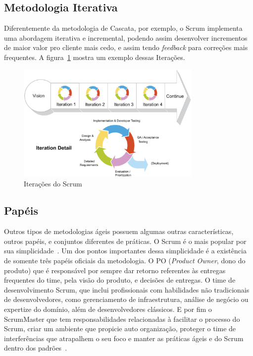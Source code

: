 \subsection{Metodologia Iterativa}

Diferentemente da metodologia de Cascata, por exemplo, o Scrum implementa uma
abordagem iterativa e incremental, podendo assim desenvolver incrementos de
maior valor pro cliente mais cedo, e assim tendo \textit{feedback} para correções
mais frequentes. A figura~\ref{fig:iterative} mostra um exemplo dessas
Iterações.~\cite{scrumreference:2016}

\begin{figure}[H]
  \centering
  \includegraphics[width=0.8\textwidth]{figuras/iterative.eps}
  \caption{Iterações do Scrum}
  \label{fig:iterative}
\end{figure}

\subsection{Papéis}

Outros tipos de metodologias ágeis possuem algumas outras características, outros
papéis, e conjuntos diferentes de práticas. O Scrum é o mais popular por sua
simplicidade~\cite{ilieva2004analyses}. Um dos pontos importantes dessa
simplicidade é a existência de somente três papéis oficiais da metodologia. O 
PO (\textit{Product Owner}, dono do produto) que é responsável por sempre dar
retorno referentes às entregas frequentes do time, pela visão do produto,
e decisões de entregas. O time de desenvolvimento Scrum, que inclui profissionais
com habilidades não tradicionais de desenvolvedores, como gerenciamento de
infraestrutura, análise de negócio ou expertize do domínio, além de
desenvolvedores clássicos. E por fim o ScrumMaster que tem responsabilidades
relacionadas à facilitar o processo do Scrum, criar um ambiente que propicie
auto organização, proteger o time de interferências que atrapalhem o seu foco e
manter as práticas ágeis e do Scrum dentro dos
padrões~\cite{scrumreference:2016}.

